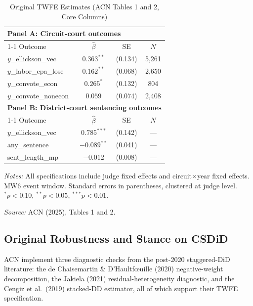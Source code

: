\documentclass[12pt,a4paper]{article}
\begin{document}
\begin{table}[htbp]
\centering
\caption{Original TWFE Estimates (ACN Tables 1 and 2, Core Columns)}
\label{tab:original_results}
\begin{threeparttable}
\begin{tabular}{lccc}
\toprule
\multicolumn{4}{l}{\textbf{Panel A: Circuit-court outcomes}} \\
\cmidrule(r){1-1}
Outcome & $\hat{\beta}$ & SE & $N$ \\
\midrule
$y$\_ellickson\_vec & $0.363^{**}$ & (0.134) & 5,261 \\
$y$\_labor\_epa\_lose & $0.162^{**}$ & (0.068) & 2,650 \\
$y$\_convote\_econ & $0.265^{*}$ & (0.132) & 804 \\
$y$\_convote\_nonecon & $0.059$ & (0.074) & 2,408 \\
\midrule
\multicolumn{4}{l}{\textbf{Panel B: District-court sentencing outcomes}} \\
\cmidrule(r){1-1}
Outcome & $\hat{\beta}$ & SE & $N$ \\
\midrule
$y$\_ellickson\_vec & $0.785^{***}$ & (0.142) & --- \\
any\_sentence & $-0.089^{**}$ & (0.041) & --- \\
sent\_length\_mp & $-0.012$ & (0.008) & --- \\
\bottomrule
\end{tabular}
\begin{tablenotes}
\item {\small \textit{Notes:} All specifications include judge fixed effects and circuit$\times$year fixed effects. MW6 event window. Standard errors in parentheses, clustered at judge level. $^{*}p<0.10$, $^{**}p<0.05$, $^{***}p<0.01$.}
\item {\small \textit{Source:} ACN (2025), Tables 1 and 2.}
\end{tablenotes}
\end{threeparttable}
\end{table}

\subsection{Original Robustness and Stance on CSDiD}

ACN implement three diagnostic checks from the post-2020 staggered-DiD literature: the de Chaisemartin \& D'Haultf{\oe}uille (2020) negative-weight decomposition, the Jakiela (2021) residual-heterogeneity diagnostic, and the Cengiz et al.\ (2019) stacked-DD estimator, all of which support their TWFE specification.
\end{document}
